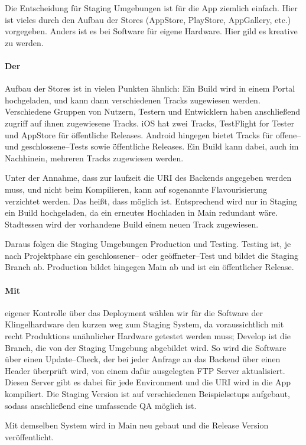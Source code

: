 Die Entscheidung für Staging Umgebungen ist für die App ziemlich einfach.
Hier ist vieles durch den Aufbau der Stores (AppStore, PlayStore, AppGallery, etc.) vorgegeben.
Anders ist es bei Software für eigene Hardware.
Hier gild es kreative zu werden.


\paragraph{\large{Der}} Aufbau der Stores ist in vielen Punkten ähnlich:
    Ein Build wird in einem Portal hochgeladen, und kann dann verschiedenen Tracks zugewiesen werden.
    Verschiedene Gruppen von Nutzern, Testern und Entwicklern haben anschließend zugriff auf ihnen zugewiesene Tracks.
    iOS hat zwei Tracks, TestFlight for Tester und AppStore für öffentliche Releases.
    Android hingegen bietet Tracks für offene-- und geschlossene--Tests sowie öffentliche Releases.
    Ein Build kann dabei, auch im Nachhinein, mehreren Tracks zugewiesen werden.


    Unter der Annahme, dass zur laufzeit die URI des Backends angegeben werden muss, und nicht beim Kompilieren, kann auf sogenannte Flavourisierung verzichtet werden.
    Das heißt, dass  möglich ist.
    Entsprechend wird nur in Staging ein Build hochgeladen, da ein erneutes Hochladen in Main redundant wäre.
    Stadtessen wird der vorhandene Build einem neuen Track zugewiesen.


    Daraus folgen die Staging Umgebungen Production und Testing.
    Testing ist, je nach Projektphase ein geschlossener-- oder geöffneter--Test und bildet die Staging Branch ab.
    Production bildet hingegen Main ab und ist ein öffentlicher Release.


\paragraph{\large{Mit}} eigener Kontrolle über das Deployment wählen wir für die Software der Klingelhardware den kurzen weg zum Staging System, da voraussichtlich mit recht Produktions unähnlicher Hardware getestet werden muss;
    Develop ist die Branch, die von der Staging Umgebung abgebildet wird.
    So wird die Software über einen Update--Check, der bei jeder Anfrage an das Backend über einen Header überprüft wird, von einem dafür ausgelegten FTP Server aktualisiert.
    Diesen Server gibt es dabei für jede Environment und die URI wird in die App kompiliert.
    Die Staging Version ist auf verschiedenen Beispielsetups aufgebaut, sodass anschließend eine umfassende QA möglich ist.


    Mit demselben System wird in Main neu gebaut und die Release Version veröffentlicht.